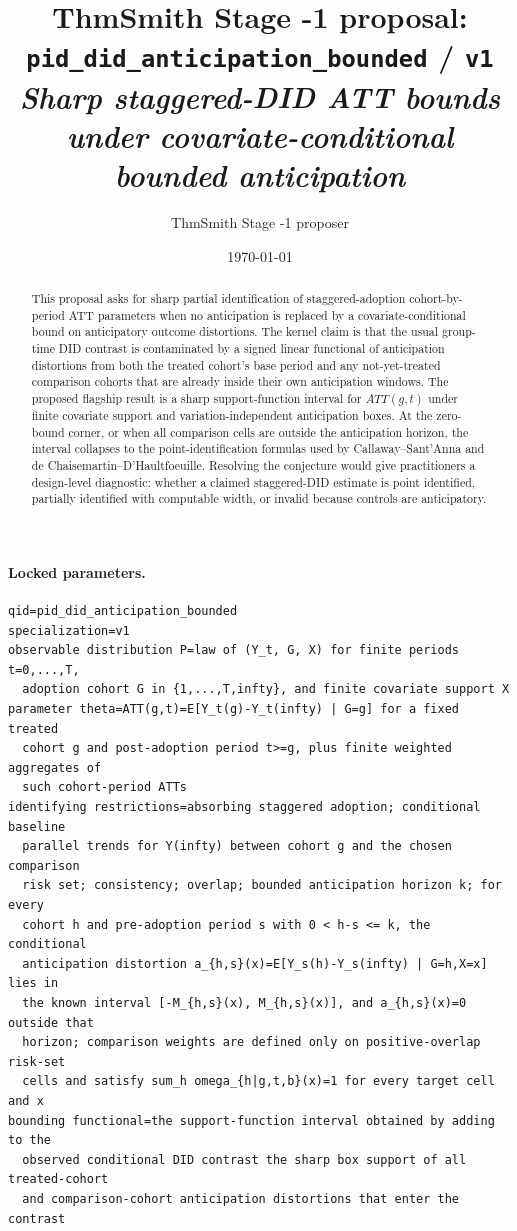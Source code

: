 \documentclass[11pt]{article}
\title{ThmSmith Stage -1 proposal: \texttt{pid\_did\_anticipation\_bounded} / \texttt{v1}%
  \\ \large\textit{Sharp staggered-DID ATT bounds under covariate-conditional bounded anticipation}}
\author{ThmSmith Stage -1 proposer}
\date{\today}
\theoremstyle{definition}
\theoremstyle{plain}
\theoremstyle{remark}
\begin{document}
\maketitle


\paragraph{Locked parameters.}
\begin{verbatim}
qid=pid_did_anticipation_bounded
specialization=v1
observable distribution P=law of (Y_t, G, X) for finite periods t=0,...,T,
  adoption cohort G in {1,...,T,infty}, and finite covariate support X
parameter theta=ATT(g,t)=E[Y_t(g)-Y_t(infty) | G=g] for a fixed treated
  cohort g and post-adoption period t>=g, plus finite weighted aggregates of
  such cohort-period ATTs
identifying restrictions=absorbing staggered adoption; conditional baseline
  parallel trends for Y(infty) between cohort g and the chosen comparison
  risk set; consistency; overlap; bounded anticipation horizon k; for every
  cohort h and pre-adoption period s with 0 < h-s <= k, the conditional
  anticipation distortion a_{h,s}(x)=E[Y_s(h)-Y_s(infty) | G=h,X=x] lies in
  the known interval [-M_{h,s}(x), M_{h,s}(x)], and a_{h,s}(x)=0 outside that
  horizon; comparison weights are defined only on positive-overlap risk-set
  cells and satisfy sum_h omega_{h|g,t,b}(x)=1 for every target cell and x
bounding functional=the support-function interval obtained by adding to the
  observed conditional DID contrast the sharp box support of all treated-cohort
  and comparison-cohort anticipation distortions that enter the contrast
\end{verbatim}

\begin{abstract}
This proposal asks for sharp partial identification of staggered-adoption cohort-by-period ATT parameters when no anticipation is replaced by a covariate-conditional bound on anticipatory outcome distortions.  The kernel claim is that the usual group-time DID contrast is contaminated by a signed linear functional of anticipation distortions from both the treated cohort's base period and any not-yet-treated comparison cohorts that are already inside their own anticipation windows.  The proposed flagship result is a sharp support-function interval for \(ATT(g,t)\) under finite covariate support and variation-independent anticipation boxes.  At the zero-bound corner, or when all comparison cells are outside the anticipation horizon, the interval collapses to the point-identification formulas used by Callaway--Sant'Anna and de Chaisemartin--D'Haultfoeuille.  Resolving the conjecture would give practitioners a design-level diagnostic: whether a claimed staggered-DID estimate is point identified, partially identified with computable width, or invalid because controls are anticipatory.
\end{abstract}
\end{document}
